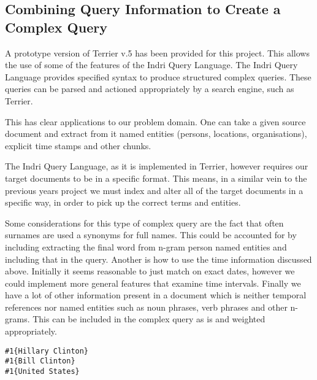 \documentclass{mprop}
\newenvironment{codelisting}{\captionsetup{type=listing}}{}
\begin{document}
\subsection{Combining Query Information to Create a Complex Query}
\label{proposedapproach.complexquery}
A prototype version of Terrier v.5 has been provided for this project. 
This allows the use of some of the features of the Indri Query Language. 
The Indri Query Language provides specified syntax to produce structured complex queries. 
These queries can be parsed and actioned appropriately by a search engine, such as Terrier.

This has clear applications to our problem domain. 
One can take a given source document and extract from it named entities (persons, locations, organisations), explicit time stamps and other chunks.

The Indri Query Language, as it is implemented in Terrier, however requires our target documents to be in a specific format. 
This means, in a similar vein to the previous years project we must index and alter all of the target documents in a specific way, in order to pick up the correct terms and entities.

Some considerations for this type of complex query are the fact that often surnames are used a synonyms for full names. 
This could be accounted for by including extracting the final word from n-gram person named entities and including that in the query. 
Another is how to use the time information discussed above. 
Initially it seems reasonable to just match on exact dates, however we could implement more general features that examine time intervals. 
Finally we have a lot of other information present in a document which is neither temporal references nor named entities such as noun phrases, verb phrases and other n-grams. 
This can be included in the complex query as is and weighted appropriately.

\begin{codelisting}
\begin{verbatim}
#1{Hillary Clinton}
#1{Bill Clinton}
#1{United States}
\end{verbatim}
\label{code:indrisample}
\end{codelisting}
\end{document}
